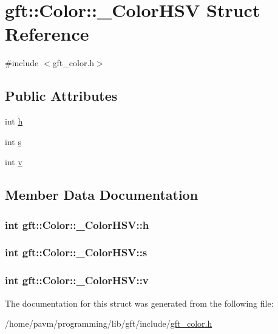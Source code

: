 \hypertarget{structgft_1_1Color_1_1__ColorHSV}{\section{gft\-:\-:Color\-:\-:\-\_\-\-Color\-H\-S\-V Struct Reference}
\label{structgft_1_1Color_1_1__ColorHSV}
}


{\ttfamily \#include $<$gft\-\_\-color.\-h$>$}

\subsection*{Public Attributes}
\begin{DoxyCompactItemize}
\item 
int \hyperlink{structgft_1_1Color_1_1__ColorHSV_ab7543db4381c62e2e7d627522c331e66}{h}
\item 
int \hyperlink{structgft_1_1Color_1_1__ColorHSV_a4f735f49ad8062bad5797d04bdd76c45}{s}
\item 
int \hyperlink{structgft_1_1Color_1_1__ColorHSV_a4030c27b07fa59ce2f6a9c88c83721c6}{v}
\end{DoxyCompactItemize}


\subsection{Member Data Documentation}
\hypertarget{structgft_1_1Color_1_1__ColorHSV_ab7543db4381c62e2e7d627522c331e66}{
\subsubsection[{h}]{\setlength{\rightskip}{0pt plus 5cm}int gft\-::\-Color\-::\-\_\-\-Color\-H\-S\-V\-::h}}\label{structgft_1_1Color_1_1__ColorHSV_ab7543db4381c62e2e7d627522c331e66}
\hypertarget{structgft_1_1Color_1_1__ColorHSV_a4f735f49ad8062bad5797d04bdd76c45}{
\subsubsection[{s}]{\setlength{\rightskip}{0pt plus 5cm}int gft\-::\-Color\-::\-\_\-\-Color\-H\-S\-V\-::s}}\label{structgft_1_1Color_1_1__ColorHSV_a4f735f49ad8062bad5797d04bdd76c45}
\hypertarget{structgft_1_1Color_1_1__ColorHSV_a4030c27b07fa59ce2f6a9c88c83721c6}{
\subsubsection[{v}]{\setlength{\rightskip}{0pt plus 5cm}int gft\-::\-Color\-::\-\_\-\-Color\-H\-S\-V\-::v}}\label{structgft_1_1Color_1_1__ColorHSV_a4030c27b07fa59ce2f6a9c88c83721c6}


The documentation for this struct was generated from the following file\-:\begin{DoxyCompactItemize}
\item 
/home/pavm/programming/lib/gft/include/\hyperlink{gft__color_8h}{gft\-\_\-color.\-h}\end{DoxyCompactItemize}
